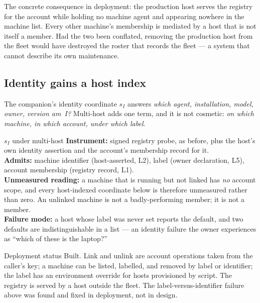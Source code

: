 \documentclass[11pt]{article}
\begin{document}
The concrete consequence in deployment: the production host serves the registry for the account while holding no machine agent and appearing nowhere in the machine list. Every other machine's membership is mediated by a host that is not itself a member. Had the two been conflated, removing the production host from the fleet would have destroyed the roster that records the fleet --- a system that cannot describe its own maintenance.

\subsection{Identity gains a host index}

The companion's identity coordinate $s_I$ answers \emph{which agent, installation, model, owner, version am~I?} Multi-host adds one term, and it is not cosmetic: \emph{on which machine, in which account, under which label}.

\begin{specbox}{$s_I$ under multi-host}
\textbf{Instrument:} signed registry probe, as before, plus the host's own identity assertion and the account's membership record for it.\\[3pt]
\textbf{Admits:} machine identifier (host-asserted, L2), label (owner declaration, L5), account membership (registry record, L1).\\[3pt]
\textbf{Unmeasured reading:} a machine that is running but not linked has \emph{no} account scope, and every host-indexed coordinate below is therefore unmeasured rather than zero. An unlinked machine is not a badly-performing member; it is not a member.\\[3pt]
\textbf{Failure mode:} a host whose label was never set reports the default, and two defaults are indistinguishable in a list --- an identity failure the owner experiences as ``which of these is the laptop?''
\end{specbox}

\begin{notebox}{Deployment status}
Built. Link and unlink are account operations taken from the caller's key; a machine can be listed, labelled, and removed by label or identifier; the label has an environment override for hosts provisioned by script. The registry is served by a host outside the fleet. The label-versus-identifier failure above was found and fixed in deployment, not in design.
\end{notebox}

\end{document}
